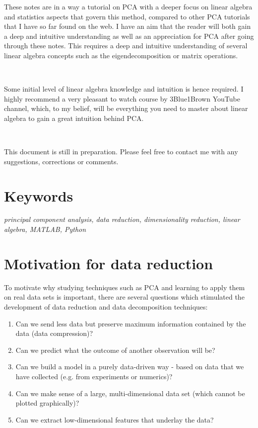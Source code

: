 \documentclass[10pt,twocolumn]{article}
\begin{document}
These notes are in a way a tutorial on PCA with a deeper focus on linear algebra and statistics aspects that govern this method, compared to other PCA tutorials that I have so far found on the web. I have an aim that the reader will both gain a deep and intuitive understanding as well as an appreciation for PCA after going through these notes. This requires a deep and intuitive understanding of several linear algebra concepts such as the eigendecomposition or matrix operations. 

\,\,

Some initial level of linear algebra knowledge and intuition is hence required.
I highly recommend a very pleasant to watch course by 3Blue1Brown YouTube channel, which, to my belief, will be everything you need to master about linear algebra to gain a great intuition behind PCA.

\,\,

This document is still in preparation. Please feel free to contact me with any suggestions, corrections or comments.

\section*{Keywords}

\textit{principal component analysis, data reduction, dimensionality reduction, linear algebra, MATLAB\textregistered, Python}

\tableofcontents

\section{Motivation for data reduction}

To motivate why studying techniques such as PCA and learning to apply them on real data sets is important, there are several questions which stimulated the development of data reduction and data decomposition techniques:

\begin{enumerate}
\item Can we send less data but preserve maximum information contained by the data (data compression)?

\item Can we predict what the outcome of another observation will be?

\item Can we build a model in a purely data-driven way - based on data that we have collected (e.g. from experiments or numerics)?

\item Can we make sense of a large, multi-dimensional data set (which cannot be plotted graphically)?

\item Can we extract low-dimensional features that underlay the data?
\end{enumerate}
\end{document}
